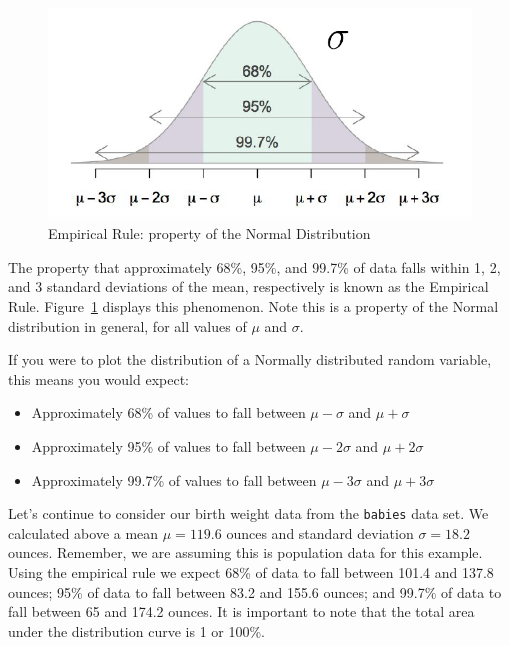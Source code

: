 \documentclass[
  letterpaper,
  DIV=11,
  numbers=noendperiod]{scrreprt}
\providecommand{\tightlist}{%
  \setlength{\itemsep}{0pt}\setlength{\parskip}{0pt}}\usepackage{longtable,booktabs,array}
\theoremstyle{definition}
\theoremstyle{remark}
\begin{document}
\begin{figure}

{\centering \includegraphics{images/empirical_rule.png}

}

\caption{\label{fig-empirical-rule2}Empirical Rule: property of the
Normal Distribution}

\end{figure}

The property that approximately 68\%, 95\%, and 99.7\% of data falls
within 1, 2, and 3 standard deviations of the mean, respectively is
known as the Empirical Rule. Figure~\ref{fig-empirical-rule2} displays
this phenomenon. Note this is a property of the Normal distribution in
general, for all values of \(\mu\) and \(\sigma\).

If you were to plot the distribution of a Normally distributed random
variable, this means you would expect:

\begin{itemize}
\tightlist
\item
  Approximately 68\% of values to fall between \(\mu-\sigma\) and
  \(\mu+\sigma\)
\item
  Approximately 95\% of values to fall between \(\mu-2\sigma\) and
  \(\mu+2\sigma\)
\item
  Approximately 99.7\% of values to fall between \(\mu-3\sigma\) and
  \(\mu+3\sigma\)
\end{itemize}

Let's continue to consider our birth weight data from the
\texttt{babies} data set. We calculated above a mean \(\mu= 119.6\)
ounces and standard deviation \(\sigma=18.2\) ounces. Remember, we are
assuming this is population data for this example. Using the empirical
rule we expect 68\% of data to fall between 101.4 and 137.8 ounces; 95\%
of data to fall between 83.2 and 155.6 ounces; and 99.7\% of data to
fall between 65 and 174.2 ounces. It is important to note that the total
area under the distribution curve is 1 or 100\%.
\end{document}
